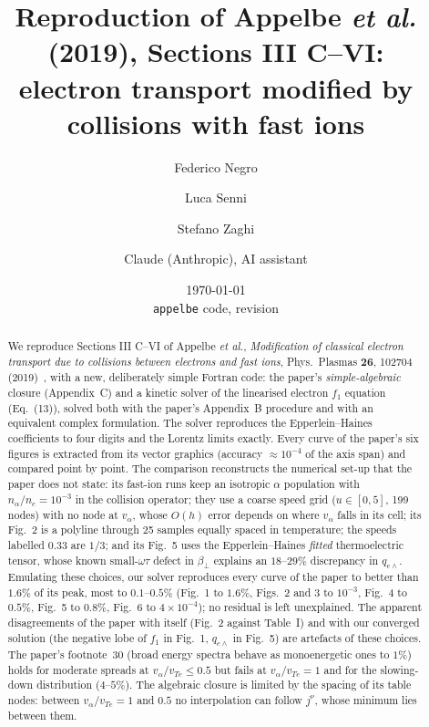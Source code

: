 \documentclass[11pt,a4paper]{article}
\title{Reproduction of Appelbe \emph{et al.} (2019), Sections III C--VI:\\
       electron transport modified by collisions with fast ions}
\author{Federico Negro \and Luca Senni \and Stefano Zaghi \and Claude (Anthropic), AI assistant}
\date{\today\\[2pt]\small\texttt{appelbe} code, revision \texttt{\GitCommit}}
\newcommand{\ot}{\omega\tau}
\begin{document}
\maketitle

\begin{abstract}
We reproduce Sections III C--VI of Appelbe \emph{et al.}, \emph{Modification of classical electron transport due to
collisions between electrons and fast ions}, Phys.\ Plasmas \textbf{26}, 102704 (2019)~\cite{appelbe2019}, with a new,
deliberately simple Fortran code: the paper's \emph{simple-algebraic} closure (Appendix~C) and a kinetic solver of the
linearised electron $f_1$ equation (Eq.~(13)), solved both with the paper's Appendix~B procedure and with an equivalent
complex formulation. The solver reproduces the Epperlein--Haines coefficients to four digits and the Lorentz limits
exactly. Every curve of the paper's six figures is extracted from its vector graphics (accuracy $\approx10^{-4}$ of the
axis span) and compared point by point. The comparison reconstructs the numerical set-up that the paper does not
state: its fast-ion runs keep an isotropic $\alpha$ population with $n_\alpha/n_e=10^{-3}$ in the collision operator; they
use a coarse speed grid ($u\in[0,5]$, 199 nodes) with no node at $v_\alpha$, whose $O(h)$ error depends on where
$v_\alpha$ falls in its cell; its Fig.~2 is a polyline through 25 samples equally spaced in temperature; the speeds
labelled 0.33 are $1/3$; and its Fig.~5 uses the Epperlein--Haines \emph{fitted} thermoelectric tensor, whose known
small-$\ot$ defect in $\beta_\perp$ explains an $18$--$29\%$ discrepancy in $q_{e\wedge}$. Emulating these choices, our solver
reproduces every curve of the paper to better than $1.6\%$ of its peak, most to $0.1$--$0.5\%$ (Fig.~1 to $1.6\%$, Figs.~2
and 3 to $10^{-3}$, Fig.~4 to $0.5\%$, Fig.~5 to $0.8\%$, Fig.~6 to $4\times10^{-4}$); no residual is left unexplained. The
apparent disagreements of the paper with itself (Fig.~2 against Table~I) and with our converged solution (the negative
lobe of $f_1$ in Fig.~1, $q_{e\wedge}$ in Fig.~5) are artefacts of these choices. The paper's footnote~30 (broad energy
spectra behave as monoenergetic ones to $1\%$) holds for moderate spreads at $v_\alpha/v_{Te}\le0.5$ but fails at
$v_\alpha/v_{Te}=1$ and for the slowing-down distribution ($4$--$5\%$). The algebraic closure is limited by the spacing of
its table nodes: between $v_\alpha/v_{Te}=1$ and $0.5$ no interpolation can follow $j^\nu$, whose minimum lies between them.
\end{abstract}
\end{document}
